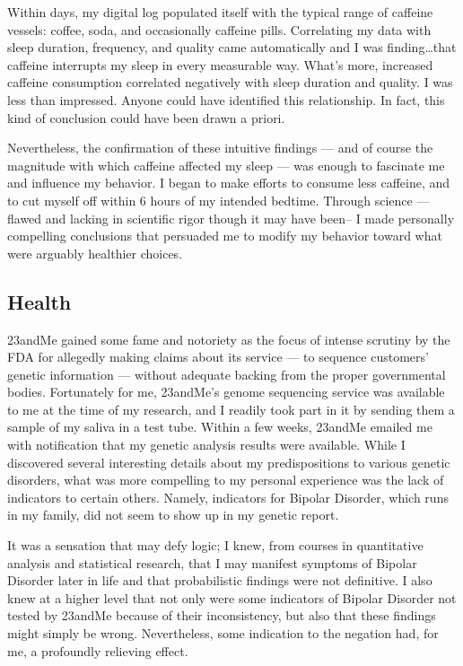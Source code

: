\documentclass{article}
\begin{document}
Within days,
my digital log populated itself with the typical range of caffeine vessels:
coffee,
soda,
and occasionally caffeine pills.
Correlating my data with sleep duration,
frequency,
and quality came automatically and I was finding\dots that caffeine interrupts my sleep in every measurable way.
What's more,
increased caffeine consumption correlated negatively with sleep duration and quality.
I was less than impressed.
Anyone could have identified this relationship.
In fact,
this kind of conclusion could have been drawn a priori.

Nevertheless,
the confirmation of these intuitive findings
--- and of course the magnitude with which caffeine affected my sleep ---
was enough to fascinate me and influence my behavior.
I began to make efforts to consume less caffeine,
and to cut myself off within 6 hours of my intended bedtime.
 Through science
 --- flawed and lacking in scientific rigor though it may have been– I made personally compelling conclusions that persuaded me to modify my behavior toward what were arguably healthier choices.

\subsection*{Health}
23andMe gained some fame and notoriety as the focus of intense scrutiny by the FDA for allegedly making claims about its service
--- to sequence customers' genetic information ---
without adequate backing from the proper governmental bodies.
Fortunately for me,
23andMe's genome sequencing service was available to me at the time of my research,
and I readily took part in it by sending them a sample of my saliva in a test tube.
Within a few weeks,
23andMe emailed me with notification that my genetic analysis results were available.
While I discovered several interesting details about my predispositions to various genetic disorders,
what was more compelling to my personal experience was the lack of indicators to certain others.
Namely,
indicators for Bipolar Disorder,
which runs in my family,
did not seem to show up in my genetic report.

It was a sensation that may defy logic;
I knew,
from courses in quantitative analysis and statistical research,
that I may manifest symptoms of Bipolar Disorder later in life and that probabilistic findings were not definitive.
I also knew at a higher level that not only were some indicators of Bipolar Disorder not tested by 23andMe because of their inconsistency,
but also that these findings might simply be wrong.
Nevertheless,
some indication to the negation had,
for me,
a profoundly relieving effect.
\end{document}
